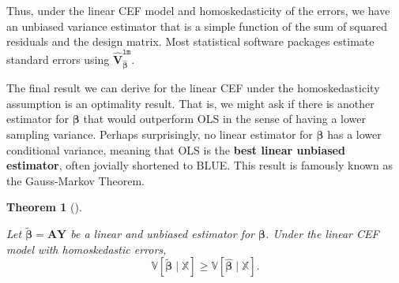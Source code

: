 \documentclass[
  13pt,
  letterpaper,
  DIV=11,
  numbers=noendperiod]{scrreprt}
\newcommand{\mb}{\symbf}
\newcommand{\V}{\mathbb{V}}
\newcommand{\Xmat}{\mathbb{X}}
\newcommand{\bfbeta}{\mb{\beta}}
\newcommand{\bhat}{\widehat{\mb{\beta}}}
\theoremstyle{definition}
\theoremstyle{definition}
\theoremstyle{plain}
\newtheorem{theorem}{Theorem}[chapter]
\theoremstyle{remark}
\begin{document}
Thus, under the linear CEF model and homoskedasticity of the errors, we
have an unbiased variance estimator that is a simple function of the sum
of squared residuals and the design matrix. Most statistical software
packages estimate standard errors using
\(\widehat{\mb{V}}^{\texttt{lm}}_{\bhat}\).

The final result we can derive for the linear CEF under the
homoskedasticity assumption is an optimality result. That is, we might
ask if there is another estimator for \(\bfbeta\) that would outperform
OLS in the sense of having a lower sampling variance. Perhaps
surprisingly, no linear estimator for \(\bfbeta\) has a lower
conditional variance, meaning that OLS is the \textbf{best linear
unbiased estimator}, often jovially shortened to BLUE. This result is
famously known as the Gauss-Markov Theorem.

\begin{theorem}[]\protect\hypertarget{thm-gauss-markov}{}\label{thm-gauss-markov}

Let \(\widetilde{\bfbeta} = \mb{AY}\) be a linear and unbiased estimator
for \(\bfbeta\). Under the linear CEF model with homoskedastic errors,
\[
\V[\widetilde{\bfbeta}\mid \Xmat] \geq \V[\bhat \mid \Xmat]. 
\]

\end{theorem}
\end{document}
